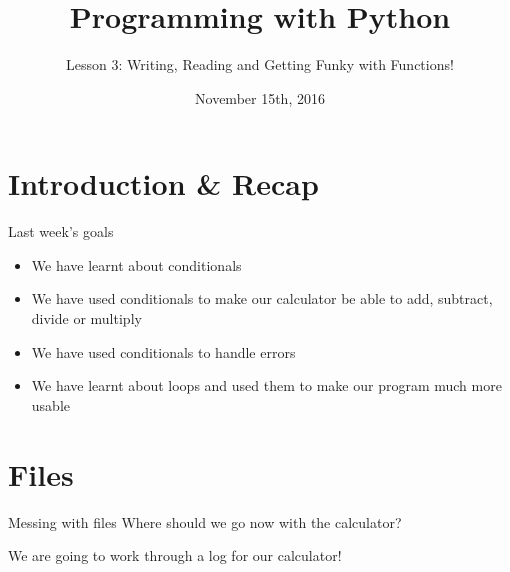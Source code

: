 \documentclass{beamer}
\title{Programming with Python}
\subtitle{Lesson 3: Writing, Reading and Getting Funky with Functions!}
\date{November 15th, 2016}
\begin{document}
\begin{frame}
  \titlepage
\end{frame}


\section{Introduction \& Recap}

\begin{frame}{Last week's goals}
\pause
\begin{itemize}
  \item We have learnt about conditionals
  \pause
  \item We have used conditionals to make our calculator be able to add, subtract, divide or multiply
  \pause
  \item We have used conditionals to handle errors
  \pause
  \item We have learnt about loops and used them to make our program much more usable
  \pause
  \end{itemize}
  
\end{frame}

\section{Files}


\begin{frame}{Messing with files}
Where should we go now with the calculator?

\pause

We are going to work through a log for our calculator!

\end{frame}
\end{document}
